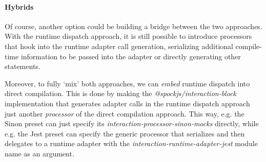 \paragraph{Hybrids}
Of course, another option could be
building a bridge between the two approaches.
With the runtime dispatch approach,
it is still possible to introduce processors that hook into
the runtime adapter call generation,
serializing additional compile-time information
to be passed into the adapter
or directly generating other statements.

Moreover, to fully `mix' both approaches,
we can \textit{embed} runtime dispatch into direct compilation.
This is done by making the \textit{@spockjs/interaction-block} implementation
that generates adapter calls in the runtime dispatch approach
just another \textit{processor} of the direct compilation approach.
This way, e.g. the Sinon preset can just specify
its \textit{interaction-processor-sinon-mocks} directly,
while e.g. the Jest preset can specify the generic processor
that serializes and then delegates to a runtime adapter
with the \textit{interaction-runtime-adapter-jest} module name as an argument.
